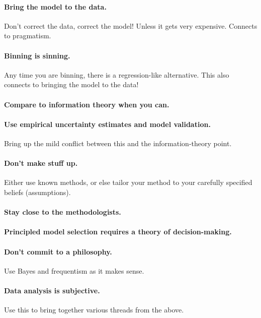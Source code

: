 \documentclass[12pt,twoside,pdftex]{article}
\begin{document}
\paragraph{Bring the model to the data.}
Don't correct the data, correct the model! Unless it gets very expensive.
Connects to pragmatism.

\paragraph{Binning is sinning.}
Any time you are binning, there is a regression-like alternative.
This also connects to bringing the model to the data!

\paragraph{Compare to information theory when you can.}

\paragraph{Use empirical uncertainty estimates and model validation.}
Bring up the mild conflict between this and the information-theory
point.

\paragraph{Don't make stuff up.}
Either use known methods, or else tailor your method to your carefully
specified beliefs (assumptions).

\paragraph{Stay close to the methodologists.}

\paragraph{Principled model selection requires a theory of decision-making.}

\paragraph{Don't commit to a philosophy.}
Use Bayes and frequentism as it makes sense.

\paragraph{Data analysis is subjective.}
Use this to bring together various threads from the above.
\end{document}

